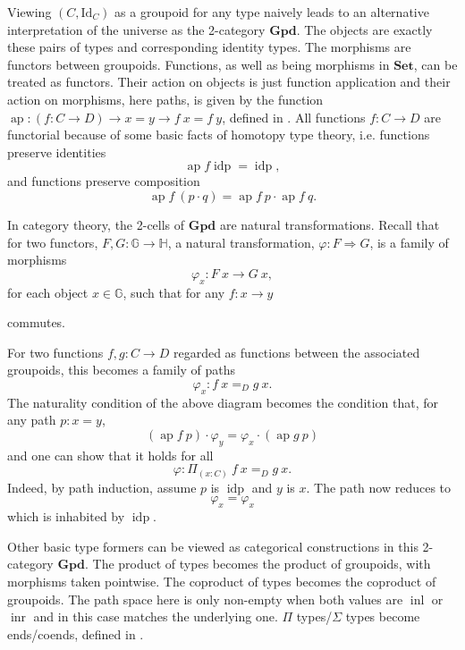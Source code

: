 \documentclass[12pt, parskip, DIV=14]{scrbook}
\newcommand{\ap}{\operatorname{ap}}
\newcommand{\idp}{\operatorname{idp}}
\newcommand{\Gpd}{\mathbf{Gpd}}
\newcommand{\inl}{\operatorname{inl}}
\newcommand{\inr}{\operatorname{inr}}
\begin{document}
Viewing $(C , \mathrm{Id}_C)$ as a groupoid for any type naively leads to an alternative interpretation of the universe as the 2-category $\Gpd$. The objects are exactly these pairs of types and corresponding identity types. The morphisms are functors between groupoids. Functions, as well as being morphisms in $\mathbf{Set}$, can be treated as functors. Their action on objects is just function application and their action on morphisms, here paths, is given by the function $\ap : (f : C \to D) \to x = y \to f~x = f~y$, defined in . All functions $f : C \to D$ are functorial because of some basic facts of homotopy type theory, i.e. functions preserve identities $$\ap f \idp = \idp,$$ and functions preserve composition $$\ap f~(p \cdot q) = \ap f~p \cdot \ap f~q.$$

In category theory, the 2-cells of $\Gpd$ are natural transformations. Recall that for two functors, $F , G : \mathbb{G} \to \mathbb{H}$, a natural transformation, $\varphi : F \Rightarrow G$, is a family of morphisms $$\varphi_x : F~x \to G~x,$$ for each object $x \in \mathbb{G}$, such that for any $f : x \to y$
\begin{center}
\end{center}
commutes.

For two functions $f, g : C \to D$ regarded as functions between the associated groupoids, this becomes a family of paths $$\varphi_x : f~x =_D g~x.$$ The naturality condition of the above diagram becomes the condition that, for any path $p : x = y$,
$$(\ap f~p) \cdot \varphi_y = \varphi_x \cdot (\ap g~p)$$
and one can show that it holds for all
$$\varphi : \Pi_{(x : C)}~f~x =_D g~x.$$ Indeed, by path induction, assume $p$ is $\idp$ and $y$ is $x$. The path now reduces to $$\varphi_x = \varphi_x$$ which is inhabited by $\idp$.

Other basic type formers can be viewed as categorical constructions in this 2-category $\Gpd$. The product of types becomes the product of groupoids, with morphisms taken pointwise. The coproduct of types becomes the coproduct of groupoids. The path space here is only non-empty when both values are $\inl$ or $\inr$ and in this case matches the underlying one. $\Pi$ types/$\Sigma$ types become ends/coends, defined in .
\end{document}
